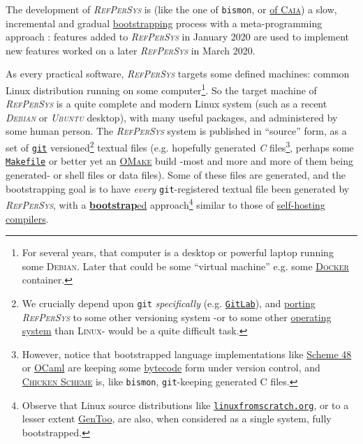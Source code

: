 \documentclass{IEEEtran}
\newcommand{\RefPerSys}{{\textit{\textsc{RefPerSys}}}}
\begin{document}
The development of {\RefPerSys} is (like the one of \texttt{bismon},
or
\href{http://bootstrappingartificialintelligence.fr/WordPress3/?s=CAIA}{of
  \textsc{Caia}}) a slow, incremental and gradual
\href{https://en.wikipedia.org/wiki/Bootstrapping}{bootstrapping}
process with a meta-programming \cite{dormoy:1992:meta,
  hernandez-phillips:2019:debugging-bootstrap} approach : features
added to {\RefPerSys} in January 2020 are used to implement new
features worked on a later {\RefPerSys} in March 2020.

As every practical software, {\RefPerSys} targets some defined
machines: common Linux distribution running on some
computer\footnote{For several years, that computer is a desktop or
powerful laptop running some \textsc{Debian}. Later that could be some
``virtual machine'' e.g. some
\href{https://www.docker.com/}{\textsc{Docker}} container.}. So the
target machine of {\RefPerSys} is a quite complete and modern Linux
system (such as a recent \textit{\textsc{Debian}} or
\textit{\textsc{Ubuntu}} desktop), with many useful packages, and
administered by some human person. The {\RefPerSys} system is published in
``source'' form, as a set of \href{http://git-scm.com/}{\texttt{git}}
versioned\footnote{We crucially depend upon \texttt{git}
\emph{specifically} (e.g. \href{http://gitlab.org/}{\texttt{GitLab}}),
and \href{https://en.wikipedia.org/wiki/Porting}{porting} {\RefPerSys}
to some other versioning system -or to some other
\href{http://pages.cs.wisc.edu/~remzi/OSTEP/}{operating system} than
\textsc{Linux}- would be a quite difficult task.} textual files
(e.g. hopefully generated \textit{C} files\footnote{However, notice that
bootstrapped language implementations like
\href{http://s48.org/}{Scheme 48} or \href{https://ocaml.org/}{OCaml}
are keeping some
\href{https://en.wikipedia.org/wiki/Bytecode}{bytecode} form under
version control, and \href{https://www.call-cc.org/}{\textsc{Chicken
    Scheme}} is, like \texttt{bismon}, \texttt{git}-keeping generated
C files.}, perhaps some
\href{https://en.wikipedia.org/wiki/Makefile}{\texttt{Makefile}} or
better yet an
\href{http://projects.camlcity.org/projects/omake.html}{\textsc{OMake}}
build -most and more and more of them being generated- or shell files or
data files). Some of these files are generated, and the bootstrapping
goal is to have \emph{every} \texttt{git}-registered textual file been
generated by {\RefPerSys}, with a
\href{https://en.wikipedia.org/wiki/Bootstrapping\_(compilers)}{\textbf{bootstrap}ed}
approach\footnote{Observe that Linux source distributions like \href{http://www.linuxfromscratch.org/}{\texttt{linuxfromscratch.org}}, or to a lesser extent \href{https://www.gentoo.org/}{GenToo}, are also, when considered as a single system, fully bootstrapped.} similar to those of
\href{https://en.wikipedia.org/wiki/Self-hosting_(compilers)}{self-hosting
  compilers}.
\medskip
\end{document}

